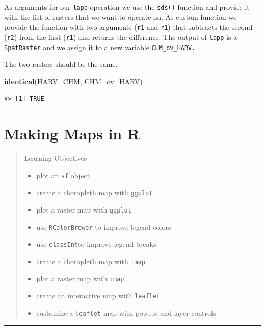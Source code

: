 \documentclass[
]{book}
\newenvironment{Shaded}{\begin{snugshade}}{\end{snugshade}}
\newcommand{\FunctionTok}[1]{\textcolor[rgb]{0.13,0.29,0.53}{\textbf{#1}}}
\newcommand{\NormalTok}[1]{#1}
\providecommand{\tightlist}{%
  \setlength{\itemsep}{0pt}\setlength{\parskip}{0pt}}
\begin{document}
As arguments for our \texttt{lapp} operation we use the \texttt{sds()} function and provide it with the list of rasters that we want to operate on. As custom function we provide the function with two arguments (\texttt{r1} and \texttt{r1}) that subtracts the second (\texttt{r2}) from the first (\texttt{r1}) and returns the difference. The output of \texttt{lapp} is a \texttt{SpatRaster} and we assign it to a new variable \texttt{CHM\_ov\_HARV.}

The two rasters should be the same.

\begin{Shaded}
\begin{Highlighting}[]
\FunctionTok{identical}\NormalTok{(HARV\_CHM, CHM\_ov\_HARV)}
\end{Highlighting}
\end{Shaded}

\begin{verbatim}
#> [1] TRUE
\end{verbatim}

\hypertarget{mapping}{%
\chapter{Making Maps in R}\label{mapping}}

\begin{quote}
Learning Objectives

\begin{itemize}
\tightlist
\item
  plot an \texttt{sf} object
\item
  create a choropleth map with \texttt{ggplot}
\item
  plot a raster map with \texttt{ggplot}
\item
  use \texttt{RColorBrewer} to improve legend colors
\item
  use \texttt{classInt}to improve legend breaks
\item
  create a choropleth map with \texttt{tmap}
\item
  plot a raster map with \texttt{tmap}
\item
  create an interactive map with \texttt{leaflet}
\item
  customize a \texttt{leaflet} map with popups and layer controls
\end{itemize}
\end{quote}

\begin{center}\rule{0.5\linewidth}{0.5pt}\end{center}
\end{document}
